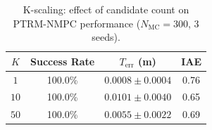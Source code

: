 \begin{table}[t]
\centering
\caption{K-scaling: effect of candidate count on PTRM-NMPC performance ($N_{\mathrm{MC}}=300$, 3 seeds).}
\label{tab:k_scaling}
\begin{tabular}{cccc}
\toprule
$K$ & Success Rate & $T_{\mathrm{err}}$ (m) & IAE \\
\midrule
  $1$ & 100.0\% & $0.0008 \pm 0.0004$ & 0.76 \\
  $10$ & 100.0\% & $0.0101 \pm 0.0040$ & 0.65 \\
  $50$ & 100.0\% & $0.0055 \pm 0.0022$ & 0.69 \\
\bottomrule
\end{tabular}
\end{table}
